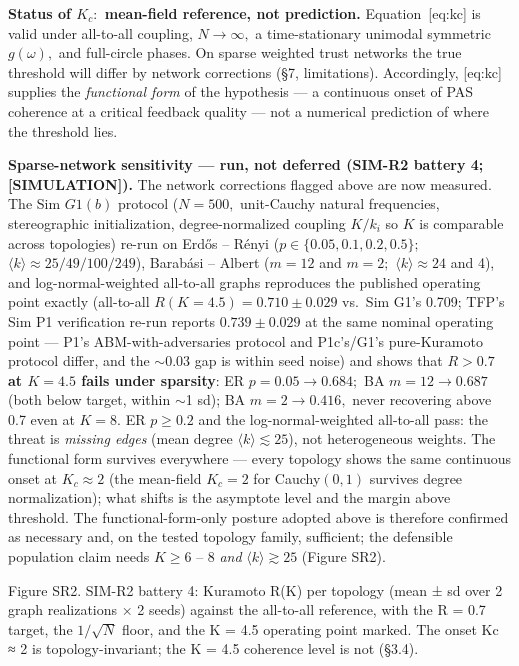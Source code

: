 \documentclass[
]{article}
\begin{document}
\textbf{Status of \(K_c:\) mean-field reference, not prediction.}
Equation~{[}eq:kc{]} is valid under all-to-all coupling,
\(N \to \infty,\) a time-stationary unimodal symmetric \(g(\omega),\)
and full-circle phases. On sparse weighted trust networks the true
threshold will differ by network corrections (§7, limitations).
Accordingly, {[}eq:kc{]} supplies the \emph{functional form} of the
hypothesis --- a continuous onset of PAS coherence at a critical
feedback quality --- not a numerical prediction of where the threshold
lies.

\textbf{Sparse-network sensitivity --- run, not deferred (SIM-R2 battery
4; {[}SIMULATION{]}).} The network corrections flagged above are now
measured. The Sim \(G1(b)\) protocol (\(N = 500,\) unit-Cauchy natural
frequencies, stereographic initialization, degree-normalized coupling
\(K/k_i\) so \(K\) is comparable across topologies) re-run on Erdős --
Rényi (\(p \in \{0.05, 0.1, 0.2, 0.5\};\)
\(\langle k\rangle \approx 25/49/100/249\)), Barabási -- Albert
(\(m = 12\) and \(m = 2;\) \(\langle k\rangle \approx 24\) and 4), and
log-normal-weighted all-to-all graphs reproduces the published operating
point exactly (all-to-all \(R(K = 4.5) = 0.710 \pm 0.029\) vs.~Sim G1's
0.709; TFP's Sim P1 verification re-run reports \(0.739 \pm 0.029\) at
the same nominal operating point --- P1's ABM-with-adversaries protocol
and P1c's/G1's pure-Kuramoto protocol differ, and the \(\sim\)0.03 gap
is within seed noise) and shows that \textbf{\(R > 0.7\) at \(K = 4.5\)
fails under sparsity}: ER \(p = 0.05 \to 0.684;\) BA
\(m = 12 \to 0.687\) (both below target, within \(\sim\)1 sd); BA
\(m = 2 \to 0.416,\) never recovering above 0.7 even at \(K = 8.\) ER
\(p \geq 0.2\) and the log-normal-weighted all-to-all pass: the threat
is \emph{missing edges} (mean degree \(\langle k\rangle \lesssim 25\)),
not heterogeneous weights. The functional form survives everywhere ---
every topology shows the same continuous onset at \(K_c \approx 2\) (the
mean-field \(K_c = 2\) for Cauchy\((0,1)\) survives degree
normalization); what shifts is the asymptote level and the margin above
threshold. The functional-form-only posture adopted above is therefore
confirmed as necessary and, on the tested topology family, sufficient;
the defensible population claim needs \(K \geq 6\) -- \(8\) \emph{and}
\(\langle k\rangle \gtrsim 25\) (Figure SR2).

Figure SR2. SIM-R2 battery 4: Kuramoto {R(K)} per topology (mean {±} sd
over 2 graph realizations {×} 2 seeds) against the all-to-all reference,
with the {R = 0.7} target, the {\(1/\sqrt{N}\)} floor, and the {K = 4.5}
operating point marked. The onset {Kc ≈ 2} is topology-invariant; the
{K = 4.5} coherence level is not (§3.4).
\end{document}
